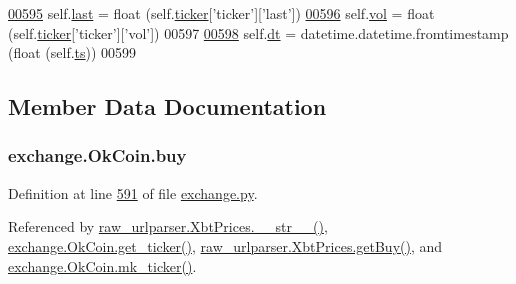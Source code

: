 \begin{DoxyCode}
\hypertarget{classexchange_1_1_ok_coin.tex_l00595}{}\hyperlink{classexchange_1_1_ok_coin_a726afbe3a75835fdcbe523aed8d6763c}{00595}         self.\hyperlink{classexchange_1_1_ok_coin_a726afbe3a75835fdcbe523aed8d6763c}{last} = float (self.\hyperlink{classexchange_1_1_exchange_a7cf9e52f993627955a2e242c388daaeb}{ticker}[\textcolor{stringliteral}{'ticker'}][\textcolor{stringliteral}{'last'}])
\hypertarget{classexchange_1_1_ok_coin.tex_l00596}{}\hyperlink{classexchange_1_1_ok_coin_ad0e78d6b3c0a24504be72a0216fc6549}{00596}         self.\hyperlink{classexchange_1_1_ok_coin_ad0e78d6b3c0a24504be72a0216fc6549}{vol}  = float (self.\hyperlink{classexchange_1_1_exchange_a7cf9e52f993627955a2e242c388daaeb}{ticker}[\textcolor{stringliteral}{'ticker'}][\textcolor{stringliteral}{'vol'}])
00597     
\hypertarget{classexchange_1_1_ok_coin.tex_l00598}{}\hyperlink{classexchange_1_1_ok_coin_ade9d7cddcfa54f2b1ba5452854bfd48b}{00598}         self.\hyperlink{classexchange_1_1_ok_coin_ade9d7cddcfa54f2b1ba5452854bfd48b}{dt} = datetime.datetime.fromtimestamp (float (self.\hyperlink{classexchange_1_1_ok_coin_a0fe6263a7f58a6fa8a688929976b7e4a}{ts}))
00599     
\end{DoxyCode}


\subsection{Member Data Documentation}
\subsubsection[{\texorpdfstring{buy}{buy}}]{\setlength{\rightskip}{0pt plus 5cm}exchange.\+Ok\+Coin.\+buy}\hypertarget{classexchange_1_1_ok_coin_aaf828e37142a83cbfb12d193313f6d43}{}\label{classexchange_1_1_ok_coin_aaf828e37142a83cbfb12d193313f6d43}


Definition at line \hyperlink{exchange_8py_source_l00591}{591} of file \hyperlink{exchange_8py_source}{exchange.\+py}.



Referenced by \hyperlink{raw__urlparser_8py_source_l00074}{raw\+\_\+urlparser.\+Xbt\+Prices.\+\_\+\+\_\+str\+\_\+\+\_\+()}, \hyperlink{exchange_8py_source_l00600}{exchange.\+Ok\+Coin.\+get\+\_\+ticker()}, \hyperlink{raw__urlparser_8py_source_l00062}{raw\+\_\+urlparser.\+Xbt\+Prices.\+get\+Buy()}, and \hyperlink{exchange_8py_source_l00614}{exchange.\+Ok\+Coin.\+mk\+\_\+ticker()}.

